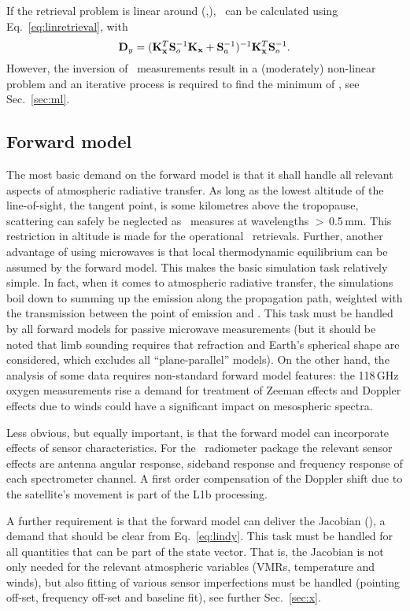 If the retrieval problem is linear around (,\FrwMdlVctHat), \RtrVct\
can be calculated using Eq.~\ref{eq:linretrieval}, with
\begin{equation}
  \label{eq:lindy}
  \mathbf{D}_{y} = (\mathbf{K}_{\mathbf{x}}^T\mathbf{S}_{o}^{-1}\mathbf{K}_{\mathbf{x}}
  +\mathbf{S}_{a}^{-1})^{-1}\mathbf{K}_{\mathbf{x}}^T\mathbf{S}_{o}^{-1}.
\end{equation}
However, the inversion of \smr\ measurements result in a (moderately)
non-linear problem and an iterative process is required to find the minimum of
\CstFnc, see Sec.~\ref{sec:ml}.


\subsection{Forward model}
\label{sec:setup:forward}
%
The most basic demand on the forward model is that it shall handle all relevant
aspects of atmospheric radiative transfer. As long as the lowest altitude of
the line-of-sight, the tangent point, is some kilometres above the tropopause,
scattering can safely be neglected as \smr\ measures at wavelengths
$>$\,0.5\,mm. This restriction in altitude is made for the operational \smr\
retrievals. Further, another advantage of using microwaves is that local
thermodynamic equilibrium can be assumed by the forward model. This makes the
basic simulation task relatively simple. In fact, when it comes to atmospheric
radiative transfer, the simulations boil down to summing up the emission along
the propagation path, weighted with the transmission between the point of
emission and \smr. This task must be handled by all forward models for passive
microwave measurements (but it should be noted that limb sounding requires that
refraction and Earth's spherical shape are considered, which excludes all
``plane-parallel'' models). On the other hand, the analysis of some data
requires non-standard forward model features: the 118\,GHz oxygen measurements
rise a demand for treatment of Zeeman effects and Doppler effects due to winds
could have a significant impact on mesospheric spectra. 

Less obvious, but equally important, is that the forward model can incorporate
effects of sensor characteristics. For the \smr\ radiometer package the
relevant sensor effects are antenna angular response, sideband response and
frequency response of each spectrometer channel. A first order compensation of
the Doppler shift due to the satellite's movement is part of the L1b
processing.

A further requirement is that the forward model can deliver the Jacobian
(\aWfnMtrTrp{\SttVct}), a demand that should be clear from Eq.~\ref{eq:lindy}.
This task must be handled for all quantities that can be part of the state
vector. That is, the Jacobian is not only needed for the relevant atmospheric
variables (VMRs, temperature and winds), but also fitting of various sensor
imperfections must be handled (pointing off-set, frequency off-set and baseline
fit), see further Sec.~\ref{sec:x}.

